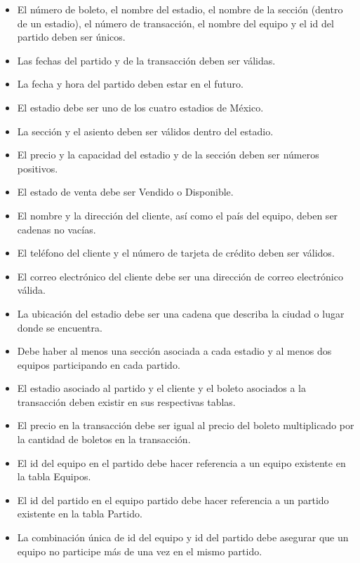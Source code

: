 \begin{itemize}
    \item El número de boleto, el nombre del estadio, el nombre de la sección (dentro de un estadio), el número de transacción, el nombre del equipo y el id del partido deben ser únicos.
    \item Las fechas del partido y de la transacción deben ser válidas.
    \item La fecha y hora del partido deben estar en el futuro.
    \item El estadio debe ser uno de los cuatro estadios de México.
    \item La sección y el asiento deben ser válidos dentro del estadio.
    \item El precio y la capacidad del estadio y de la sección deben ser números positivos.
    \item El estado de venta debe ser Vendido o Disponible.
    \item El nombre y la dirección del cliente, así como el país del equipo, deben ser cadenas no vacías.
    \item El teléfono del cliente y el número de tarjeta de crédito deben ser válidos.
    \item El correo electrónico del cliente debe ser una dirección de correo electrónico válida.
    \item La ubicación del estadio debe ser una cadena que describa la ciudad o lugar donde se encuentra.
    \item Debe haber al menos una sección asociada a cada estadio y al menos dos equipos participando en cada partido.
    \item El estadio asociado al partido y el cliente y el boleto asociados a la transacción deben existir en sus respectivas tablas.
    \item El precio en la transacción debe ser igual al precio del boleto multiplicado por la cantidad de boletos en la transacción.
    \item El id del equipo en el partido debe hacer referencia a un equipo existente en la tabla Equipos.
    \item El id del partido en el equipo partido debe hacer referencia a un partido existente en la tabla Partido.
    \item La combinación única de id del equipo y id del partido debe asegurar que un equipo no participe más de una vez en el mismo partido.
\end{itemize}



